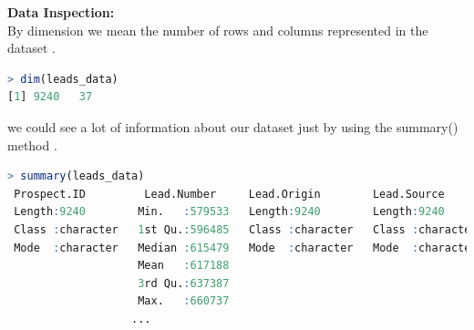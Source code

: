 \textbf{\large Data Inspection: }\\
By dimension we mean the number of rows and columns represented in the dataset . 
\begin{lstlisting}[language=R]
> dim(leads_data)
[1] 9240   37
\end{lstlisting}
we could see a lot of information about our dataset just by using the summary() method .  
\begin{lstlisting}[language=R]
> summary(leads_data)
 Prospect.ID         Lead.Number     Lead.Origin        Lead.Source        Do.Not.Email      
 Length:9240        Min.   :579533   Length:9240        Length:9240        Length:9240       
 Class :character   1st Qu.:596485   Class :character   Class :character   Class :character  
 Mode  :character   Median :615479   Mode  :character   Mode  :character   Mode  :character  
                    Mean   :617188           
                    3rd Qu.:637387          
                    Max.   :660737                
                   ...
 \end{lstlisting}



